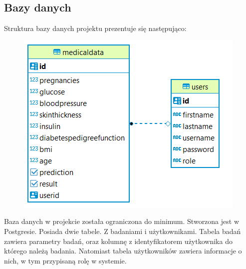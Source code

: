 \documentclass[12pt,a4paper]{article}
\begin{document}
    \newpage
	\subsection*{Bazy danych}
Struktura bazy danych projektu prezentuje się następująco:
\begin{figure}[h!]
\includegraphics{img/baza.png}
\end{figure}  

Baza danych w projekcie została ograniczona do minimum. Stworzona jest w Postgresie. Posiada dwie tabele. Z badaniami i użytkownikami. Tabela badań zawiera parametry badań, oraz kolumnę z identyfikatorem użytkownika do którego należą badania. Natomiast tabela użytkowników zawiera informacje o nich, w tym przypisaną rolę w systemie.
\end{document}
